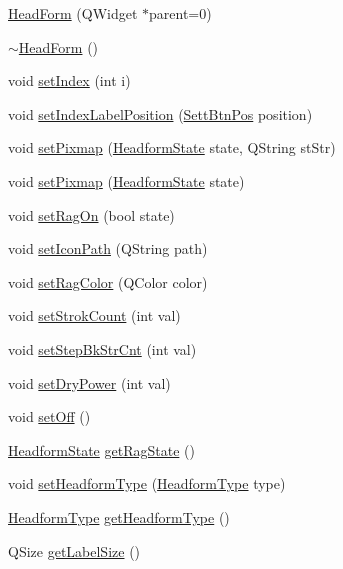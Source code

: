 \begin{DoxyCompactItemize}
\item 
\mbox{\hyperlink{classHeadForm_a9474e3d5af0aad57f847d1a38eba8591}{Head\+Form}} (Q\+Widget $\ast$parent=0)
\item 
\mbox{\hyperlink{classHeadForm_ac4a0350cd62ed18740505fe61ba75d80}{$\sim$\+Head\+Form}} ()
\item 
void \mbox{\hyperlink{classHeadForm_acd6d67e3691918b0e4c6716b079e67d0}{set\+Index}} (int i)
\item 
void \mbox{\hyperlink{classHeadForm_af74e0d29b259aa4f2e9529346237207a}{set\+Index\+Label\+Position}} (\mbox{\hyperlink{classHeadForm_ae0ae43de172739d43f503ff0a03aad1a}{Sett\+Btn\+Pos}} position)
\item 
void \mbox{\hyperlink{classHeadForm_ac2845f30dc7686178380c9c108b4c5bf}{set\+Pixmap}} (\mbox{\hyperlink{classHeadForm_ae7f8ba0c9db5a5140ac4e3417dc1d9b2}{Headform\+State}} state, Q\+String st\+Str)
\item 
void \mbox{\hyperlink{classHeadForm_a934e12ca808cb22f74734df9852e7146}{set\+Pixmap}} (\mbox{\hyperlink{classHeadForm_ae7f8ba0c9db5a5140ac4e3417dc1d9b2}{Headform\+State}} state)
\item 
void \mbox{\hyperlink{classHeadForm_aaa15b61ff5f3bdbf8c3e7a329fb6b0cb}{set\+Rag\+On}} (bool state)
\item 
void \mbox{\hyperlink{classHeadForm_acb2b064f0453aeed4a5bea49cc33be47}{set\+Icon\+Path}} (Q\+String path)
\item 
void \mbox{\hyperlink{classHeadForm_a69a9f3ad37ba31a3c1f8a5c491b6272d}{set\+Rag\+Color}} (Q\+Color color)
\item 
void \mbox{\hyperlink{classHeadForm_a8e86ad0f2d29ec594c62dbfd253b5fee}{set\+Strok\+Count}} (int val)
\item 
void \mbox{\hyperlink{classHeadForm_a6b5082ea42b171300a105d6a35d52c91}{set\+Step\+Bk\+Str\+Cnt}} (int val)
\item 
void \mbox{\hyperlink{classHeadForm_afd37ba9a460ed5bf74c5b0b40394feb5}{set\+Dry\+Power}} (int val)
\item 
void \mbox{\hyperlink{classHeadForm_a75d114050b779cd5793a4968b06e8178}{set\+Off}} ()
\item 
\mbox{\hyperlink{classHeadForm_ae7f8ba0c9db5a5140ac4e3417dc1d9b2}{Headform\+State}} \mbox{\hyperlink{classHeadForm_a35de102780fe0011543c31d62f8bd72e}{get\+Rag\+State}} ()
\item 
void \mbox{\hyperlink{classHeadForm_aa61be1b4d88c7afbfff172190d40cc07}{set\+Headform\+Type}} (\mbox{\hyperlink{classHeadForm_a15bfe98cd74c9677947211a02313f7d1}{Headform\+Type}} type)
\item 
\mbox{\hyperlink{classHeadForm_a15bfe98cd74c9677947211a02313f7d1}{Headform\+Type}} \mbox{\hyperlink{classHeadForm_a8e521c0edb67751bebcc8f82e9176a16}{get\+Headform\+Type}} ()
\item 
Q\+Size \mbox{\hyperlink{classHeadForm_a138f7ab8bf3996a036e587b0ea7f4237}{get\+Label\+Size}} ()
\end{DoxyCompactItemize}
